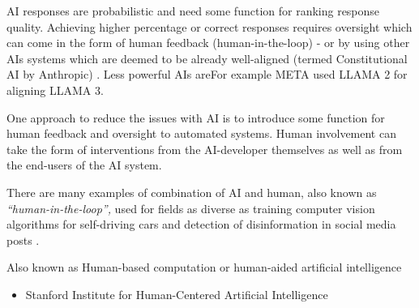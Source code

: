 \documentclass[
  letterpaper,
  DIV=11,
  numbers=noendperiod]{scrartcl}
\providecommand{\tightlist}{%
  \setlength{\itemsep}{0pt}\setlength{\parskip}{0pt}}\usepackage{longtable,booktabs,array}
\begin{document}
AI responses are probabilistic and need some function for ranking
response quality. Achieving higher percentage or correct responses
requires oversight which can come in the form of human feedback
(human-in-the-loop) - or by using other AIs systems which are deemed to
be already well-aligned (termed Constitutional AI by Anthropic)
\citep{baileyAIEducation2023, baiConstitutionalAIHarmlessness2022}. Less
powerful AIs areFor example META used LLAMA 2 for aligning LLAMA 3.

One approach to reduce the issues with AI is to introduce some function
for human feedback and oversight to automated systems. Human involvement
can take the form of interventions from the AI-developer themselves as
well as from the end-users of the AI system.

There are many examples of combination of AI and human, also known as
\emph{``human-in-the-loop'',} used for fields as diverse as training
computer vision algorithms for self-driving cars and detection of
disinformation in social media posts
\citep{wuHumanintheLoopAIEnhancing2023, bonet-joverSemiautomaticAnnotationMethodology2023}.

Also known as Human-based computation or human-aided artificial
intelligence
\citep{Shahaf2007TowardsAT, muhlhoffHumanaidedArtificialIntelligence2019}

\begin{itemize}
\tightlist
\item
  Stanford Institute for Human-Centered Artificial Intelligence
  \citet{gewangHumansLoopDesign2019}
\end{itemize}
\end{document}
